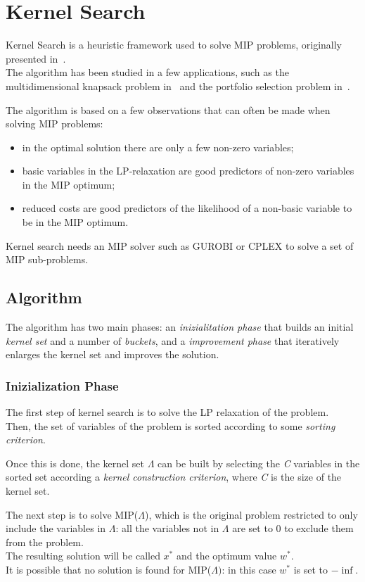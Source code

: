 \chapter{Kernel Search}

Kernel Search is a heuristic framework used to solve MIP problems, originally presented in~\cite{kernel:2007}.\\
The algorithm has been studied in a few applications, such as the multidimensional knapsack problem
in~\cite{kernel:2010} and the portfolio selection problem in~\cite{kernel:2012}.

The algorithm is based on a few observations that can often be made when solving MIP problems:
\begin{itemize}
    \item in the optimal solution there are only a few non-zero variables;
    \item basic variables in the LP-relaxation are good predictors of non-zero variables in the MIP optimum;
    \item reduced costs are good predictors of the likelihood of a non-basic variable to be in the MIP optimum.
\end{itemize}

Kernel search needs an MIP solver such as GUROBI or CPLEX to solve a set of MIP sub-problems.


\section{Algorithm}
The algorithm has two main phases: an \textit{inizialitation phase}
that builds an initial \textit{kernel set} and a number of \textit{buckets},
and a \textit{improvement phase} that iteratively enlarges the kernel set and improves the solution.

\subsection{Inizialization Phase}
The first step of kernel search is to solve the LP relaxation of the problem.\\
Then, the set of variables of the problem is sorted according to some \textit{sorting criterion}.

Once this is done, the kernel set \(\Lambda\) can be built by selecting the \textit{C}
variables in the sorted set according a \textit{kernel construction criterion},
where \textit{C} is the size of the kernel set.

The next step is to solve MIP(\(\Lambda\)),
which is the original problem restricted to only include the variables in \(\Lambda\):
all the variables not in \(\Lambda\) are set to 0 to exclude them from the problem.\\
The resulting solution will be called \(x^{*}\) and the optimum value \(w^{*}\).\\
It is possible that no solution is found for MIP(\(\Lambda)\): in this case \(w^{*}\) is set to \(-\inf\).

